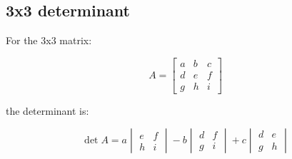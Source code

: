 \documentclass{article}
\begin{document}
\subsection{3x3 determinant}

For the 3x3 matrix:

\[ A = \begin{bmatrix}a & b & c\\d & e & f\\g & h & i\end{bmatrix} \]

the determinant is:

\[ \det{A} = a \begin{vmatrix} e & f \\ h & i\end{vmatrix} - b \begin{vmatrix} d & f \\ g & i\end{vmatrix} + c \begin{vmatrix} d & e \\ g & h\end{vmatrix} \]
\end{document}
